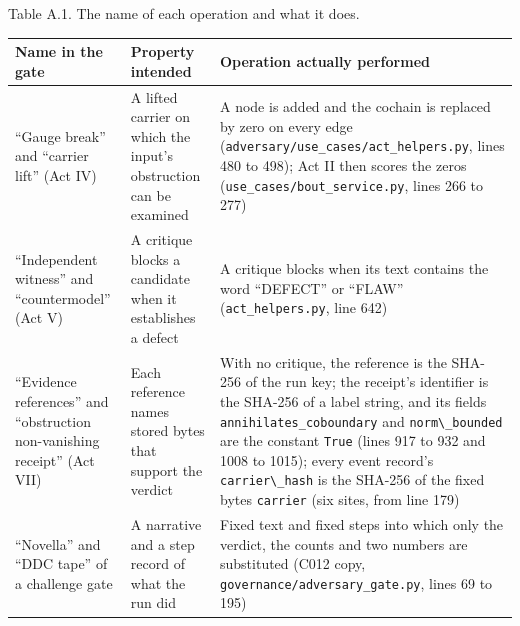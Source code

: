 \documentclass[
  11pt,
]{article}
\newcommand{\passthrough}[1]{#1}
\begin{document}
Table A.1. The name of each operation and what it does.

\begin{longtable}[]{@{}
  >{\raggedright\arraybackslash}p{}
  >{\raggedright\arraybackslash}p{}
  >{\raggedright\arraybackslash}p{}@{}}
\toprule\noalign{}
\begin{minipage}[b]{\linewidth}\raggedright
Name in the gate
\end{minipage} & \begin{minipage}[b]{\linewidth}\raggedright
Property intended
\end{minipage} & \begin{minipage}[b]{\linewidth}\raggedright
Operation actually performed
\end{minipage} \\
\midrule\noalign{}
\endhead
\bottomrule\noalign{}
\endlastfoot
``Gauge break'' and ``carrier lift'' (Act IV) & A lifted carrier on
which the input's obstruction can be examined & A node is added and the
cochain is replaced by zero on every edge
(\nolinkurl{adversary/use_cases/act_helpers.py}, lines 480 to
498); Act II then scores the zeros
(\nolinkurl{use_cases/bout_service.py}, lines 266 to 277) \\
``Independent witness'' and ``countermodel'' (Act V) & A critique blocks
a candidate when it establishes a defect & A critique blocks when its
text contains the word ``DEFECT'' or ``FLAW''
(\nolinkurl{act_helpers.py}, line 642) \\
``Evidence references'' and ``obstruction non-vanishing receipt'' (Act
VII) & Each reference names stored bytes that support the verdict & With
no critique, the reference is the SHA-256 of the run key; the receipt's
identifier is the SHA-256 of a label string, and its fields
\nolinkurl{annihilates_coboundary} and
\passthrough{\lstinline!norm\_bounded!} are the constant
\passthrough{\lstinline!True!} (lines 917 to 932 and 1008 to 1015);
every event record's \passthrough{\lstinline!carrier\_hash!} is the
SHA-256 of the fixed bytes \passthrough{\lstinline!carrier!} (six sites,
from line 179) \\
``Novella'' and ``DDC tape'' of a challenge gate & A narrative and a
step record of what the run did & Fixed text and fixed steps into which
only the verdict, the counts and two numbers are substituted (C012 copy,
\nolinkurl{governance/adversary_gate.py}, lines 69 to 195) \\
\end{longtable}
\end{document}
